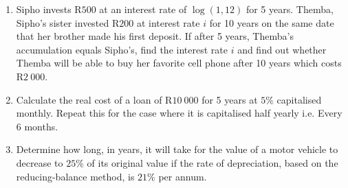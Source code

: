 \begin{enumerate}
\item{Sipho invests R$500$ at an interest rate of $\log(1,12)$ for 5 years. Themba, Sipho's sister invested R$200$ at interest rate $i$ for 10 years on the same date that her brother made his first deposit. If after 5 years, Themba's accumulation equals Sipho's, find the interest rate $i$ and find out whether Themba will be able to buy her favorite cell phone after 10 years which costs R$2~000$.}


\item{Calculate the real cost of a loan of R$10~000$ for 5 years at $5\%$ capitalised monthly. Repeat this for the case where it is capitalised half yearly i.e. Every 6 months.}
\item{Determine how long, in years, it will take for the value of a motor vehicle to decrease
to $25\%$ of its original value if the rate of depreciation, based on the reducing-balance
method, is $21\%$ per annum.}


\end{enumerate}







